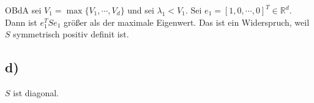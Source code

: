 \documentclass[paper=a4,fontsize=10pt,DIV11,BCOR10mm]{scrartcl}
\begin{document}
OBdA sei $V_1 = \max \{ V_1, \cdots, V_d \}$ und sei $\lambda_1 < V_1$. Sei $e_1 = [1, 0, \cdots, 0]^T \in \mathbb{R}^d$. Dann ist $e_1^T S e_1$ größer als der maximale Eigenwert. Das ist ein Widerspruch, weil $S$ symmetrisch positiv definit ist.



\subsection*{d)}

$S$ ist diagonal.



\end{document}
